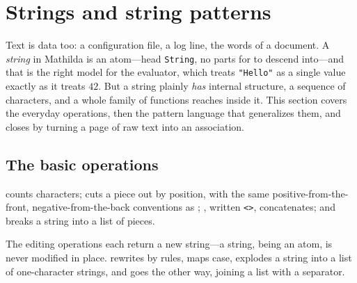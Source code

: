 
\section{Strings and string patterns}
\label{sec:ds-strings}

Text is data too: a configuration file, a log line, the words of a document. A
\emph{string} in Mathilda is an atom---head \texttt{String}, no parts
for  to descend into---and that is the right model for the evaluator,
which treats \texttt{"Hello"} as a single value exactly as it treats \(42\). But a
string plainly \emph{has} internal structure, a sequence of characters, and a whole
family of functions reaches inside it. This section covers the everyday operations,
then the pattern language that generalizes them, and closes by turning a page of raw
text into an association.

\subsection{The basic operations}
\label{ssec:ds-string-basics}

 counts characters;  cuts a piece out by position,
with the same positive-from-the-front, negative-from-the-back conventions as
; , written \texttt{<>}, concatenates; and
 breaks a string into a list of pieces.

\begin{codepairs}
\end{codepairs}

The editing operations each return a new string---a string, being an atom, is never
modified in place.  rewrites by rules,  maps case,
 explodes a string into a list of one-character strings, and
 goes the other way, joining a list with a separator.

